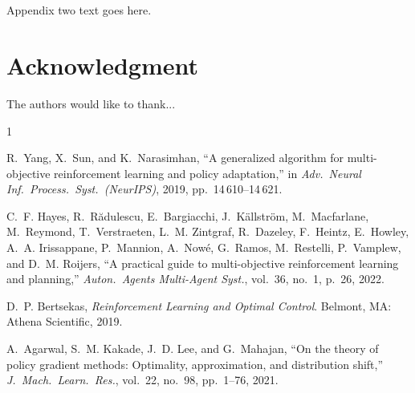 \documentclass[journal]{IEEEtran}
\begin{document}
\section{}
Appendix two text goes here.


\section*{Acknowledgment}


The authors would like to thank...


\ifCLASSOPTIONcaptionsoff
  \newpage
\fi





%
%
%
\begin{thebibliography}{1}

R.~Yang, X.~Sun, and K.~Narasimhan, ``A generalized algorithm for
multi-objective reinforcement learning and policy adaptation,'' in
\emph{Adv.\ Neural Inf.\ Process.\ Syst.\ (NeurIPS)}, 2019,
pp.~14\,610--14\,621.

C.~F. Hayes, R.~R\u{a}dulescu, E.~Bargiacchi, J.~K\"{a}llstr\"{o}m,
M.~Macfarlane, M.~Reymond, T.~Verstraeten, L.~M. Zintgraf, R.~Dazeley,
F.~Heintz, E.~Howley, A.~A. Irissappane, P.~Mannion, A.~Now\'{e},
G.~Ramos, M.~Restelli, P.~Vamplew, and D.~M. Roijers, ``A practical guide
to multi-objective reinforcement learning and planning,'' \emph{Auton.\
Agents Multi-Agent Syst.}, vol.~36, no.~1, p.~26, 2022.

D.~P. Bertsekas, \emph{Reinforcement Learning and Optimal Control}.
Belmont, MA: Athena Scientific, 2019.

A.~Agarwal, S.~M. Kakade, J.~D. Lee, and G.~Mahajan, ``On the theory of
policy gradient methods: Optimality, approximation, and distribution
shift,'' \emph{J.\ Mach.\ Learn.\ Res.}, vol.~22, no.~98, pp.~1--76,
2021.

\end{thebibliography}
\end{document}

